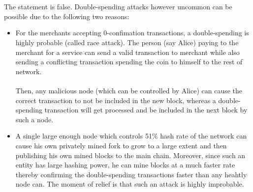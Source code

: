 \section{}
The statement  is false. Double-spending attacks however uncommon can be possible due to the following two reasons:

\begin{itemize}
	\item For the merchants accepting 0-confimation transactions, a double-spending is highly probable (called race attack). The person (say Alice) paying to the merchant for a service can send a valid transaction to merchant while also sending a conflicting transaction spending the coin to himself to the rest of network. \\ \\
		Then, any malicious node (which can be controlled by Alice) can cause the correct transaction to not be included in the new block, whereas a double-spending transaction will get processed and be included in the next block by such a node.
		\item {} A single large enough node which controls 51\% hash rate of the network can cause his own privately mined fork to grow to a large extent and then publishing his own mined blocks to the main chain.
			Moreover, since such an entity has large hashing power, he can mine blocks at a much faster rate thereby confirming the double-spending transactions faster than any heahtly node can. The moment of relief is that such an attack is highly improbable.  
\end{itemize}
